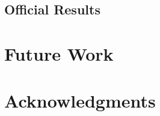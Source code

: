 \documentclass[11pt,a4paper]{article}
\begin{document}
\subsection{Official Results}








\section{Future Work}\label{future}





\section*{Acknowledgments}

\ \newline
\newpage


\end{document}
